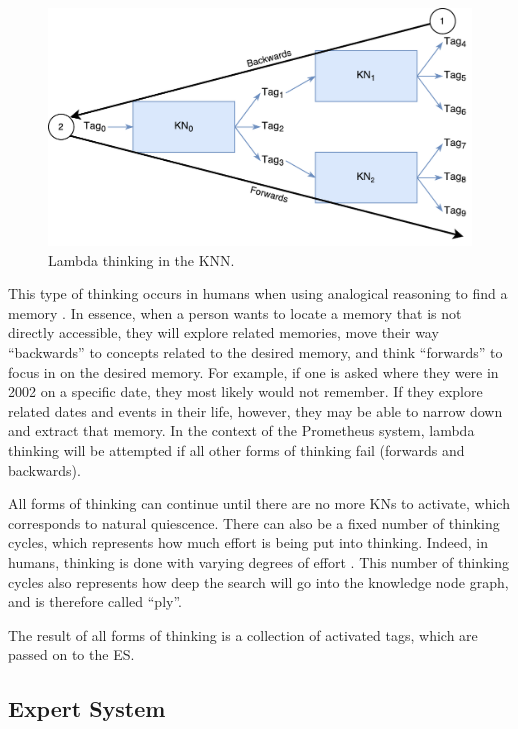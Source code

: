 \documentclass[titlepage,11pt]{article}
\begin{document}
\begin{figure}[!htb]
	\includegraphics[width=\columnwidth]{figures/lambda_thinking.pdf}
	\caption{Lambda thinking in the KNN.}
	\label{think_lambda}
\end{figure}

This type of thinking occurs in humans when using analogical reasoning to find a memory \cite{vybihal-lambda}. In essence, when a person wants to locate a memory that is not directly accessible, they will explore related memories, move their way ``backwards'' to concepts related to the desired memory, and think ``forwards'' to focus in on the desired memory. For example, if one is asked where they were in 2002 on a specific date, they most likely would not remember. If they explore related dates and events in their life, however, they may be able to narrow down and extract that memory. In the context of the Prometheus system, lambda thinking will be attempted if all other forms of thinking fail (forwards and backwards).

All forms of thinking can continue until there are no more KNs to activate, which corresponds to natural quiescence. There can also be a fixed number of thinking cycles, which represents how much effort is being put into thinking. Indeed, in humans, thinking is done with varying degrees of effort \cite{thinking}. This number of thinking cycles also represents how deep the search will go into the knowledge node graph, and is therefore called ``ply''.

The result of all forms of thinking is a collection of activated tags, which are passed on to the ES.

\subsection{Expert System}
\end{document}
